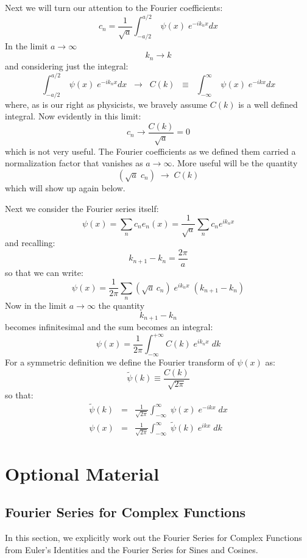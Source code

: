 \documentclass[12pt]{book}
\begin{document}
Next we will turn our attention to the Fourier coefficients:
$$c_n = \frac{1}{\sqrt{a}} \int_{-a/2}^{a/2} \; \psi(x) \; e^{-ik_nx} dx$$
In the limit $a \to \infty$
$$k_n \to k$$
and considering just the integral:
$$\int_{-a/2}^{a/2} \; \psi(x) \; e^{-ik_nx} dx \;\; \to \;\; C(k) \;\; \equiv \;\; \int_{-\infty}^{\infty} \; \psi(x) \; e^{-ikx} dx$$
where, as is our right as physicists, we bravely assume $C(k)$ is a well defined integral.
Now evidently in this limit:
$$c_n \to \frac{C(k)}{\sqrt{a}} = 0$$
which is not very useful.  The Fourier coefficients as we defined them carried a normalization factor that vanishes as $a \to \infty$.  More useful will be the quantity
$$ \left(\sqrt{a} \; c_n \right) \; \to \; C(k) $$
which will show up again below.

Next we consider the Fourier series itself:
$$\psi(x) = \sum_n c_n e_n(x) = \frac{1}{\sqrt{a}} \sum_n c_n e^{i k_n x}$$
and recalling:
$$k_{n+1}-k_n = \frac{2\pi}{a}$$
so that we can write:
$$\psi(x) = \frac{1}{2\pi} \sum_n (\sqrt{a} \, c_n) \; e^{i k_n x} \; (k_{n+1}-k_{n})$$
Now in the limit $a \to \infty$ the quantity $$k_{n+1}-k_{n}$$ becomes infinitesimal 
and the sum becomes an integral:
$$\psi(x) = \frac{1}{2\pi} \int_{-\infty}^{+\infty} C(k) \; e^{i k_n x} \; dk$$
For a symmetric definition we define the Fourier transform of $\psi(x)$ as:
\begin{equation*}
\widetilde{\psi}(k) \equiv \frac{C(k)}{\sqrt{2\pi}} 
\end{equation*}
so that:
\begin{eqnarray}
\widetilde{\psi}(k) &=& \frac{1}{\sqrt{2\pi}} 
\int_{-\infty}^{\infty} \; \psi(x) \; e^{-ikx} \; dx \\[8pt]
\psi(x) &=& \frac{1}{\sqrt{2\pi}} 
\int_{-\infty}^{\infty} \; \widetilde{\psi}(k) \; e^{ikx} \; dk
\end{eqnarray}



\section{Optional Material}

\subsection{Fourier Series for Complex Functions}

In this section, we explicitly work out the Fourier Series for Complex Functions from Euler's Identities and the Fourier Series for Sines and Cosines.
\end{document}
